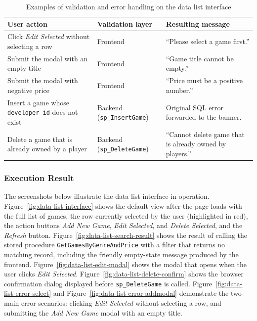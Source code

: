 \begin{table}[H]
\centering
\caption{Examples of validation and error handling on the data list interface}
\label{tab:gamelist-validation}
\begin{tabular}{|p{4.5cm}|p{4cm}|p{5cm}|}
\hline
\textbf{User action} & \textbf{Validation layer} & \textbf{Resulting message} \\ \hline
Click \textit{Edit Selected} without selecting a row & Frontend & ``Please select a game first.'' \\ \hline
Submit the modal with an empty title & Frontend & ``Game title cannot be empty.'' \\ \hline
Submit the modal with negative price & Frontend & ``Price must be a positive number.'' \\ \hline
Insert a game whose \texttt{developer\_id} does not exist & Backend (\texttt{sp\_InsertGame}) & Original SQL error forwarded to the banner. \\ \hline
Delete a game that is already owned by a player & Backend (\texttt{sp\_DeleteGame}) & ``Cannot delete game that is already owned by players.'' \\ \hline
\end{tabular}
\end{table}

\subsubsection{Execution Result}

The screenshots below illustrate the data list interface in operation. Figure~\ref{fig:data-list-interface} shows the default view after the page loads with the full list of games, the row currently selected by the user (highlighted in red), the action buttons \textit{Add New Game}, \textit{Edit Selected}, and \textit{Delete Selected}, and the \textit{Refresh} button. Figure~\ref{fig:data-list-search-result} shows the result of calling the stored procedure \texttt{GetGamesByGenreAndPrice} with a filter that returns no matching record, including the friendly empty-state message produced by the frontend. Figure~\ref{fig:data-list-edit-modal} shows the modal that opens when the user clicks \textit{Edit Selected}. Figure~\ref{fig:data-list-delete-confirm} shows the browser confirmation dialog displayed before \texttt{sp\_DeleteGame} is called. Figure~\ref{fig:data-list-error-select} and Figure~\ref{fig:data-list-error-addmodal} demonstrate the two main error scenarios: clicking \textit{Edit Selected} without selecting a row, and submitting the \textit{Add New Game} modal with an empty title.

